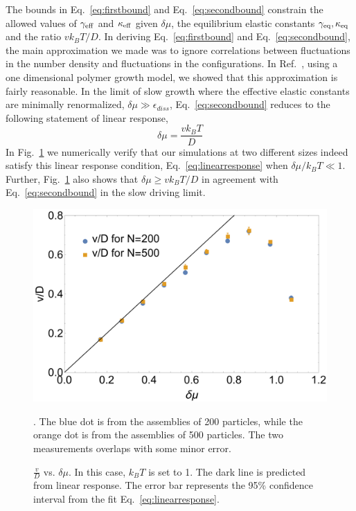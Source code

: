 \documentclass[amsmath,preprintnumbers,10pt,nofootinbib,prl,twocolumn]{revtex4-1}
\begin{document}
The bounds in Eq.~\ref{eq:firstbound} and Eq.~\ref{eq:secondbound} constrain the allowed values of $\gamma_{\rm eff}$ and $\kappa_{\rm eff}$ given $\delta \mu$, the equilibrium elastic constants $\gamma_{\rm eq}, \kappa_{\rm eq}$ and the ratio $vk_BT/D$. In deriving Eq.~\ref{eq:firstbound} and Eq.~\ref{eq:secondbound}, the main approximation we made was to ignore correlations between fluctuations in the number density and fluctuations in the configurations. In Ref.~\cite{Nguyen2016}, using a one dimensional polymer growth model, we showed that this approximation is fairly reasonable. 
In the limit of slow growth where the effective elastic constants are minimally renormalized, $\delta\mu \gg \epsilon_{diss}$, Eq.~\ref{eq:secondbound} reduces to the following statement of linear response,
\begin{equation}
\label{eq:linearresponse}
\delta\mu=\frac{v k_B T}{D}
\end{equation}
In Fig.~\ref{fig:LinearResponse} we numerically verify that our simulations at two different sizes indeed satisfy this linear response condition, Eq.~\ref{eq:linearresponse} when $\delta \mu/k_B T \ll 1$. Further, Fig.~\ref{fig:LinearResponse} also shows that $\delta \mu \geq vk_BT/D$ in agreement with Eq.~\ref{eq:secondbound} in the slow driving limit.  


\begin{figure}[tbb]
\centering
\includegraphics[scale=0.3]{linearresponseregimeFig5.pdf}
\caption{$\frac{v}{D}$ vs. $\delta\mu$. In this case, $k_BT$ is set to 1. The dark line is predicted from linear response. The error bar represents the 95\% confidence interval from the fit Eq.~\ref{eq:linearresponse}.} \label{fig:LinearResponse}. The blue dot is from the assemblies of 200 particles, while the orange dot is from the assemblies of 500 particles. The two measurements overlaps with some minor error. \end{figure} 
\end{document}
